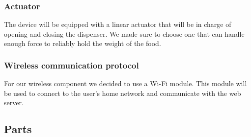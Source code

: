 \documentclass{article}
\begin{document}
\subsubsection{Actuator}
The device will be equipped with a linear actuator that will be in charge of opening and closing the dispenser. We made sure to choose one that can handle enough force to reliably hold the weight of the food.
\subsubsection{Wireless communication protocol}
For our wireless component we decided to use a Wi-Fi module. This module will be used to connect to the user's home network and communicate with the web server.
\subsection{Parts}
\end{document}
